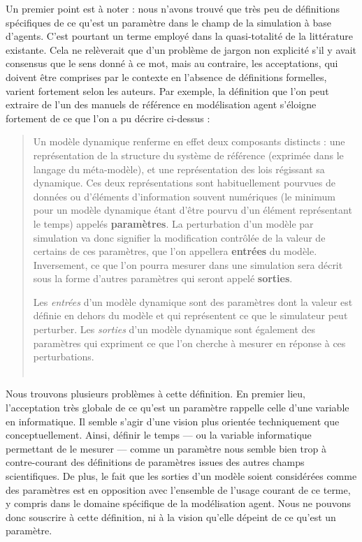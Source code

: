Un premier point est à noter : nous n'avons trouvé que très peu de définitions spécifiques de ce qu'est un paramètre dans le champ de la simulation à base d'agents.
C'est pourtant un terme employé dans la quasi-totalité de la littérature existante.
Cela ne relèverait que d'un problème de jargon non explicité s'il y avait consensus que le sens donné à ce mot, mais au contraire, les acceptations, qui doivent être comprises par le contexte en l'absence de définitions formelles, varient fortement selon les auteurs.
Par exemple, la définition que l'on peut extraire de l'un des manuels de référence en modélisation agent \autocite{treuil_modelisation_2008} s'éloigne fortement de ce que l'on a pu décrire ci-dessus :
\begin{quotation}
	\noindent \og
	Un modèle dynamique renferme en effet deux composants distincts : une représentation de la structure du système de référence (exprimée dans le langage du méta-modèle), et une représentation des lois régissant sa dynamique.
	Ces deux représentations sont habituellement pourvues de données ou d'éléments d'information souvent numériques (le minimum pour un modèle dynamique étant d'être pourvu d'un élément représentant le temps) appelés \textbf{paramètres}.
	La \og perturbation\fg{} d'un modèle par simulation va donc signifier la modification contrôlée de la valeur de certains de ces paramètres, que l'on appellera \textbf{entrées} du modèle.
	Inversement, ce que l'on pourra mesurer dans une simulation sera décrit sous la forme d'autres paramètres qui seront appelé \textbf{sorties}.
	
	\noindent Les \textit{entrées} d'un modèle dynamique sont des paramètres dont la valeur est définie en dehors du modèle et qui représentent ce que le simulateur peut perturber.
	Les \textit{sorties} d'un modèle dynamique sont également des paramètres qui expriment ce que l'on cherche à mesurer en réponse à ces perturbations.\fg{}\\
	\mbox{}~ \hfill \autocite[8]{treuil_modelisation_2008}
\end{quotation}

Nous trouvons plusieurs problèmes à cette définition.
En premier lieu, l'acceptation très globale de ce qu'est un paramètre rappelle celle d'une variable en informatique.
Il semble s'agir d'une vision plus orientée techniquement que conceptuellement.
Ainsi, définir le temps --- ou la variable informatique permettant de le mesurer --- comme un paramètre nous semble bien trop à contre-courant des définitions de paramètres issues des autres champs scientifiques.
De plus, le fait que les sorties d'un modèle soient considérées comme des paramètres est en opposition avec l'ensemble de l'usage courant de ce terme, y compris dans le domaine spécifique de la modélisation agent.
Nous ne pouvons donc souscrire à cette définition, ni à la vision qu'elle dépeint de ce qu'est un paramètre.


